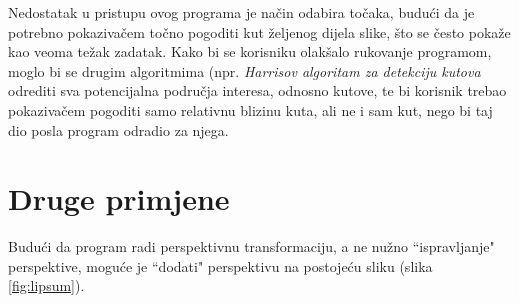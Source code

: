 Nedostatak u pristupu ovog programa je način odabira točaka, budući da je potrebno pokazivačem točno pogoditi kut željenog dijela slike, što se često pokaže kao veoma težak zadatak. Kako bi se korisniku olakšalo rukovanje programom, moglo bi se drugim algoritmima (npr. \emph{Harrisov algoritam za detekciju kutova} odrediti sva potencijalna područja interesa, odnosno kutove, te bi korisnik trebao pokazivačem pogoditi samo relativnu blizinu kuta, ali ne i sam kut, nego bi taj dio posla program odradio za njega.

\clearpage
\section{Druge primjene}
\label{sec:drugePrimjene}

Budući da program radi perspektivnu transformaciju, a ne nužno ``ispravljanje" perspektive, moguće je ``dodati" perspektivu na postojeću sliku (slika \ref{fig:lipsum}).

